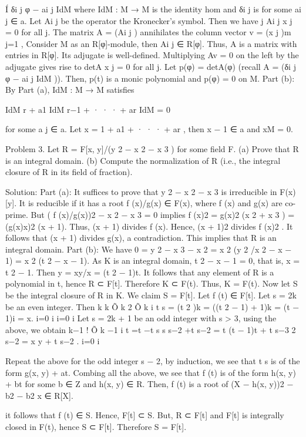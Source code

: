 \documentclass[UTF8,12pt]{ctexart}
\begin{document}
Í δi j φ − ai j IdM where IdM : M → M is the identity hom and δi j is for some ai j ∈ a. Let Ai j be the operator the Kronecker’s symbol. Then we have j Ai j x j = 0 for all j. The matrix A = (Ai j ) annihilates the column vector v = (x j )m j=1 , Consider M as an R[φ]-module, then Ai j ∈ R[φ]. Thus, A is a matrix with entries in R[φ]. Its adjugate is well-defined. Multiplying Av = 0 on the left by the adjugate gives rise to detA x j = 0 for all j. Let p(φ) = detA(φ) (recall A = (δi j φ − ai j IdM )). Then, p(t) is a monic polynomial and p(φ) = 0 on M. Part (b): By Part (a), IdM : M → M satisfies

IdM r + a1 IdM r−1 + · · · + ar IdM = 0

for some a j ∈ a. Let x = 1 + a1 + · · · + ar , then x − 1 ∈ a and xM = 0.

Problem 3. Let R = F[x, y]/(y 2 − x 2 − x 3 ) for some field F. (a) Prove that R is an integral domain. (b) Compute the normalization of R (i.e., the integral closure of R in its field of fraction).

Solution: Part (a): It suffices to prove that y 2 − x 2 − x 3 is irreducible in F(x)[y]. It is reducible if it has a root f (x)/g(x) ∈ F(x), where f (x) and g(x) are co-prime. But ( f (x)/g(x))2 − x 2 − x 3 = 0 implies f (x)2 = g(x)2 (x 2 + x 3 ) = (g(x)x)2 (x + 1). Thus, (x + 1) divides f (x). Hence, (x + 1)2 divides f (x)2 . It follows that (x + 1) divides g(x), a contradiction. This implies that R is an integral domain. Part (b): We have 0 = y 2 − x 3 − x 2 = x 2 (y 2 /x 2 − x − 1) = x 2 (t 2 − x − 1). As K is an integral domain, t 2 − x − 1 = 0, that is, x = t 2 − 1. Then y = xy/x = (t 2 − 1)t. It follows that any element of R is a polynomial in t, hence R ⊂ F[t]. Therefore K ⊂ F(t). Thus, K = F(t). Now let S be the integral closure of R in K. We claim S = F[t]. Let f (t) ∈ F[t]. Let s = 2k be an even integer. Then k k Õ k 2 Õ k i t s = (t 2 )k = ((t 2 − 1) + 1)k = (t − 1)i = x. i=0 i i=0 i Let s = 2k + 1 be an odd integer with s > 3, using the above, we obtain k−1 ! Õ k −1 i t =t −t s s s−2 +t s−2 = t (t − 1)t + t s−3 2 s−2 = x y + t s−2 . i=0 i

Repeat the above for the odd integer s − 2, by induction, we see that t s is of the form g(x, y) + at. Combing all the above, we see that f (t) is of the form h(x, y) + bt for some b ∈ Z and h(x, y) ∈ R. Then, f (t) is a root of (X − h(x, y))2 − b2 − b2 x ∈ R[X].

it follows that f (t) ∈ S. Hence, F[t] ⊂ S. But, R ⊂ F[t] and F[t] is integrally closed in F(t), hence S ⊂ F[t]. Therefore S = F[t].
\end{document}
